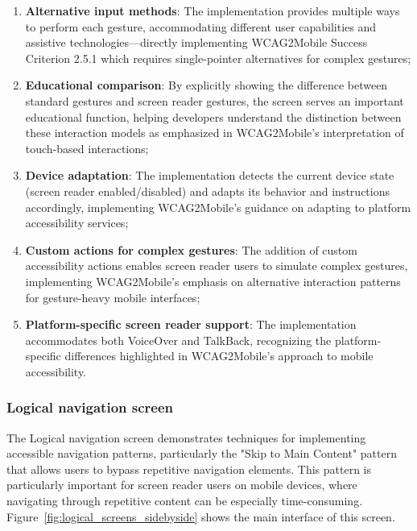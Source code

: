 \begin{enumerate}
    \item \textbf{Alternative input methods}: The implementation provides multiple ways to perform each gesture, accommodating different user capabilities and assistive technologies—directly implementing WCAG2Mobile Success Criterion 2.5.1 which requires single-pointer alternatives for complex gestures;
    
    \item \textbf{Educational comparison}: By explicitly showing the difference between standard gestures and screen reader gestures, the screen serves an important educational function, helping developers understand the distinction between these interaction models as emphasized in WCAG2Mobile's interpretation of touch-based interactions;
    
    \item \textbf{Device adaptation}: The implementation detects the current device state (screen reader enabled/disabled) and adapts its behavior and instructions accordingly, implementing WCAG2Mobile's guidance on adapting to platform accessibility services;
    
    \item \textbf{Custom actions for complex gestures}: The addition of custom accessibility actions enables screen reader users to simulate complex gestures, implementing WCAG2Mobile's emphasis on alternative interaction patterns for gesture-heavy mobile interfaces;
    
    \item \textbf{Platform-specific screen reader support}: The implementation accommodates both VoiceOver and TalkBack, recognizing the platform-specific differences highlighted in WCAG2Mobile's approach to mobile accessibility.
\end{enumerate}

\subsubsection{Logical navigation screen}
\label{subsubsec:logical-navigation}

The Logical navigation screen demonstrates techniques for implementing accessible navigation patterns, particularly the "Skip to Main Content" pattern that allows users to bypass repetitive navigation elements. This pattern is particularly important for screen reader users on mobile devices, where navigating through repetitive content can be especially time-consuming. Figure~\ref{fig:logical_screens_sidebyside} shows the main interface of this screen.


